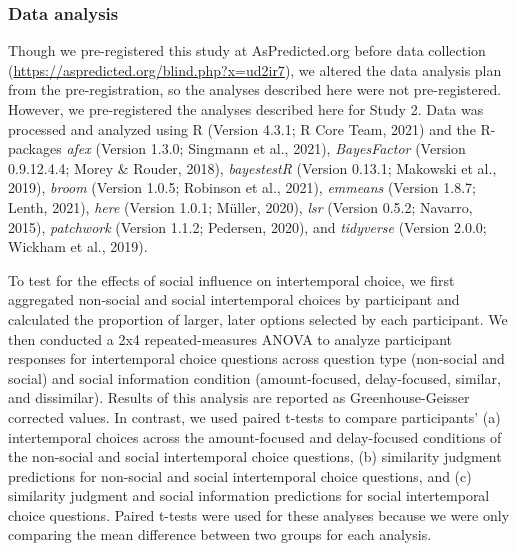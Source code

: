 \documentclass[
  pub,floatsintext]{apa6}
\begin{document}
\hypertarget{data-analysis}{%
\subsubsection{Data analysis}\label{data-analysis}}

Though we pre-registered this study at AsPredicted.org before data collection (\url{https://aspredicted.org/blind.php?x=ud2ir7}), we altered the data analysis plan from the pre-registration, so the analyses described here were not pre-registered. However, we pre-registered the analyses described here for Study 2. Data was processed and analyzed using R (Version 4.3.1; R Core Team, 2021) and the R-packages \emph{afex} (Version 1.3.0; Singmann et al., 2021), \emph{BayesFactor} (Version 0.9.12.4.4; Morey \& Rouder, 2018), \emph{bayestestR} (Version 0.13.1; Makowski et al., 2019), \emph{broom} (Version 1.0.5; Robinson et al., 2021), \emph{emmeans} (Version 1.8.7; Lenth, 2021), \emph{here} (Version 1.0.1; Müller, 2020), \emph{lsr} (Version 0.5.2; Navarro, 2015), \emph{patchwork} (Version 1.1.2; Pedersen, 2020), and \emph{tidyverse} (Version 2.0.0; Wickham et al., 2019).

To test for the effects of social influence on intertemporal choice, we first aggregated non-social and social intertemporal choices by participant and calculated the proportion of larger, later options selected by each participant. We then conducted a 2x4 repeated-measures ANOVA to analyze participant responses for intertemporal choice questions across question type (non-social and social) and social information condition (amount-focused, delay-focused, similar, and dissimilar). Results of this analysis are reported as Greenhouse-Geisser corrected values. In contrast, we used paired t-tests to compare participants' (a) intertemporal choices across the amount-focused and delay-focused conditions of the non-social and social intertemporal choice questions, (b) similarity judgment predictions for non-social and social intertemporal choice questions, and (c) similarity judgment and social information predictions for social intertemporal choice questions. Paired t-tests were used for these analyses because we were only comparing the mean difference between two groups for each analysis.
\end{document}
